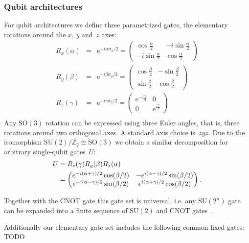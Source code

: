 \documentclass[amsmath,amssymb,aps,pra,10pt,twocolumn,groupedaddress,nofootinbib]{revtex4-1}
\newcommand{\isom}{\cong} %
\newcommand{\bpm}{\begin{pmatrix}}
\newcommand{\epm}{\end{pmatrix}}
\newcommand{\Z}{\ensuremath{\mathbb Z}}  %
\newcommand{\SO}{\text{SO}} %
\newcommand{\SU}{\text{SU}} %
\newcommand{\CNOT}{\text{CNOT}}
\newcommand{\e}{\mathrm{e}}
\begin{document}
\subsubsection{Qubit architectures}

For qubit architectures we define three parametrized gates,
the elementary rotations around the $x$, $y$ and~$z$ axes:
\begin{eqnarray*}
        R_x(\alpha) &=& \e^{-i\alpha \sigma_x/2} =
        \begin{pmatrix}
          \cos \frac{\alpha}{2} & -i \sin \frac{\alpha}{2}\\
          -i \sin \frac{\alpha}{2} & \cos \frac{\alpha}{2}
        \end{pmatrix}\\
        R_y(\beta) &=& \e^{-i\beta \sigma_y/2} =
        \begin{pmatrix}
          \cos \frac{\beta}{2} & -\sin \frac{\beta}{2}\\
          \sin \frac{\beta}{2} & \cos \frac{\beta}{2}
        \end{pmatrix}\\
        R_z(\gamma) &=& \e^{-i\gamma \sigma_z/2}=
        \begin{pmatrix}
          \e^{-i \frac{\gamma}{2}} & 0\\
          0 & \e^{i \frac{\gamma}{2}}
        \end{pmatrix}\\
\end{eqnarray*}
Any $\SO(3)$ rotation can be expressed using three Euler angles, that
is, three rotations around two orthogonal axes. A standard axis choice is~$zyz$.
Due to the isomorphism $\SU(2)/\Z_2 \isom \SO(3)$ we obtain a similar decomposition
for arbitrary single-qubit gates~$U$:
\begin{align}
\label{eq:app:euler}
\notag
U &= R_z(\gamma) R_y(\beta) R_z(\alpha)\\
&=
\bpm
e^{-i(\alpha+\gamma)/2} \cos(\beta/2) & -e^{i(\alpha-\gamma)/2} \sin(\beta/2)\\
e^{-i(\alpha-\gamma)/2} \sin(\beta/2) &  e^{i(\alpha+\gamma)/2} \cos(\beta/2)
\epm.
\end{align}

Together with the $\CNOT$ gate this gate set is universal, i.e. any $\SU(2^n)$
gate can be expanded into a finite sequence of $\SU(2)$ and $\CNOT$ gates~\cite{barenco1995}.


Additionally our elementary gate set includes the following common fixed gates:
TODO
\end{document}
